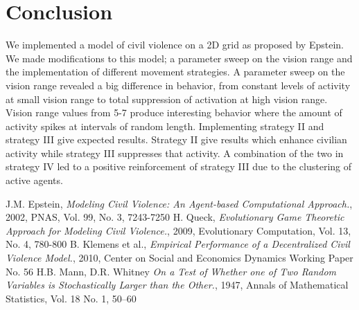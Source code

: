 \documentclass[11pt,a4paper,onecolumn]{article}
\begin{document}
\section{Conclusion}
We implemented a model of civil violence on a 2D grid as proposed by Epstein. We made modifications to this model; a parameter sweep on the vision range and the implementation of different movement strategies. A parameter sweep on the vision range revealed a big difference in behavior, from constant levels of activity at small vision range to total suppression of activation at high vision range. Vision range values from 5-7 produce interesting behavior where the amount of activity spikes at intervals of random length.
Implementing strategy II and strategy III give expected results. Strategy II give results which enhance civilian activity while strategy III suppresses that activity. A combination of the two in strategy IV led to a positive reinforcement of strategy III due to the clustering of active agents.

\newpage

\begin{thebibliography}{7}
  J.M. Epstein, \emph{Modeling Civil Violence: An Agent-based Computational Approach.}, 2002, PNAS, Vol. 99, No. 3, 7243-7250
  H. Queck, \emph{Evolutionary Game Theoretic Approach for Modeling Civil Violence.}, 2009, Evolutionary Computation, Vol. 13, No. 4, 780-800
  B. Klemens et al., \emph{Empirical Performance of a Decentralized Civil Violence Model.}, 2010, Center on Social and Economics Dynamics Working Paper No. 56
  H.B. Mann, D.R. Whitney \emph{On a Test of Whether one of Two Random Variables is Stochastically Larger than the Other.}, 1947, Annals of Mathematical Statistics, Vol. 18 No. 1, 50–60
\end{thebibliography}
\end{document}
